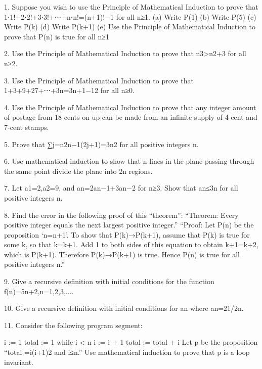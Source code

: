 1. Suppose you wish to use the Principle of Mathematical Induction to prove that
1⋅1!+2⋅2!+3⋅3!+⋅⋅⋅+n⋅n!=(n+1)!−1 for all n≥1.
(a) Write P(1) (b) Write P(5) (c) Write P(k) (d) Write P(k+1) (e) Use the Principle of Mathematical Induction to prove that P(n) is true for all n≥1

2. Use the Principle of Mathematical Induction to prove that n3>n2+3 for all n≥2. 

3. Use the Principle of Mathematical Induction to prove that 1+3+9+27+⋅⋅⋅+3n=3n+1−12 for all n≥0.

4. Use the Principle of Mathematical Induction to prove that any integer amount of postage from 18 cents on up can be made from an infinite supply of 4-cent and 7-cent stamps.

5. Prove that ∑j=n2n−1(2j+1)=3n2 for all positive integers n. 

6. Use mathematical induction to show that n lines in the plane passing through the same point divide the plane into 2n regions.

7. Let a1=2,a2=9, and an=2an−1+3an−2 for n≥3. Show that an≤3n for all positive integers n. 

8. Find the error in the following proof of this “theorem”: “Theorem: Every positive integer equals the next largest positive integer.” “Proof: Let P(n) be the proposition ‘n=n+1’. To show that P(k)→P(k+1), assume that P(k) is true for some k, so that k=k+1. Add 1 to both sides of this equation to obtain k+1=k+2, which is P(k+1). Therefore P(k)→P(k+1) is true. Hence P(n) is true for all positive integers n.”

9. Give a recursive definition with initial conditions for the function f(n)=5n+2,n=1,2,3,....

10. Give a recursive definition with initial conditions for {an} where an=21/2n.

11. Consider the following program segment:

i := 1
total := 1 
while i < n
  i := i + 1
  total := total + i
Let p be the proposition “total =i(i+1)2 and i≤n.” Use mathematical induction to prove that p is a loop invariant.

